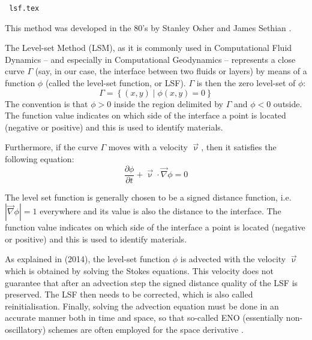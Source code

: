 \begin{flushright} {\tiny \tt {\color{gray} lsf.tex}} \end{flushright}

This method was developed in the 80's by Stanley Osher and James Sethian \cite{lofo06}.

The Level-set Method (LSM), as it is commonly used in Computational Fluid Dynamics -- and especially 
in Computational Geodynamics -- represents a close curve $\Gamma$ (say, in our case, the 
interface between two fluids or layers) by means of a function $\phi$ (called the level-set function, or LSF).
$\Gamma$ is then the zero level-set of $\phi$:
\begin{equation}
\Gamma = \left\{ (x,y) \; |\; \phi(x,y)=0 \right\}
\end{equation}
The convention is that $\phi>0$ inside the region delimited by $\Gamma$ and $\phi<0$ outside.
The function value indicates on which side of the
interface a point is located (negative or positive) and this is
used to identify materials. 

Furthermore, if the curve $\Gamma$ moves with a velocity $\vec \upnu$, 
then it satisfies the following equation:
\begin{equation}
\frac{\partial \phi}{\partial t} + \vec\upnu \cdot \vec\nabla \phi = 0 
\end{equation}

The level set function is generally chosen to
be a signed distance function, i.e. $|\vec\nabla \phi| = 1$ everywhere 
and its value is also the distance to the interface.
The function value indicates on which side of the interface a
point is located (negative or positive) and this is used to identify materials.

As explained in \textcite{hitg14} (2014), the level-set function $\phi$ is advected 
with the velocity $\vec\upnu$ which is obtained by solving the Stokes equations.
This velocity does not guarantee that after an advection step the signed 
distance quality of the LSF is preserved. 
The LSF then needs to be corrected, which is also called reinitialisation. 
Finally, solving the advection equation must be done in an accurate manner both in time and space,
so that so-called ENO (essentially non-oscillatory) schemes are often employed for the 
space derivative \cite{ossh91,saev10}.


